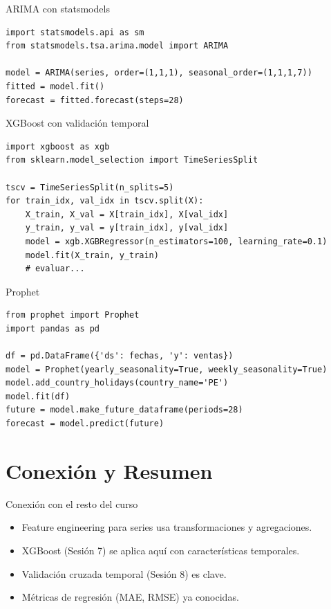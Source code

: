\documentclass[aspectratio=169, 10pt, xcolor=table]{beamer}
\begin{document}
\begin{frame}[fragile]{ARIMA con statsmodels}
    \begin{lstlisting}
import statsmodels.api as sm
from statsmodels.tsa.arima.model import ARIMA

model = ARIMA(series, order=(1,1,1), seasonal_order=(1,1,1,7))
fitted = model.fit()
forecast = fitted.forecast(steps=28)
    \end{lstlisting}
\end{frame}

\begin{frame}[fragile]{XGBoost con validación temporal}
    \begin{lstlisting}
import xgboost as xgb
from sklearn.model_selection import TimeSeriesSplit

tscv = TimeSeriesSplit(n_splits=5)
for train_idx, val_idx in tscv.split(X):
    X_train, X_val = X[train_idx], X[val_idx]
    y_train, y_val = y[train_idx], y[val_idx]
    model = xgb.XGBRegressor(n_estimators=100, learning_rate=0.1)
    model.fit(X_train, y_train)
    # evaluar...
    \end{lstlisting}
\end{frame}

\begin{frame}[fragile]{Prophet}
    \begin{lstlisting}
from prophet import Prophet
import pandas as pd

df = pd.DataFrame({'ds': fechas, 'y': ventas})
model = Prophet(yearly_seasonality=True, weekly_seasonality=True)
model.add_country_holidays(country_name='PE')
model.fit(df)
future = model.make_future_dataframe(periods=28)
forecast = model.predict(future)
    \end{lstlisting}
\end{frame}

\section{Conexión y Resumen}

\begin{frame}{Conexión con el resto del curso}
    \begin{itemize}
        \item Feature engineering para series usa transformaciones y agregaciones.
        \item XGBoost (Sesión 7) se aplica aquí con características temporales.
        \item Validación cruzada temporal (Sesión 8) es clave.
        \item Métricas de regresión (MAE, RMSE) ya conocidas.
    \end{itemize}
\end{frame}
\end{document}
